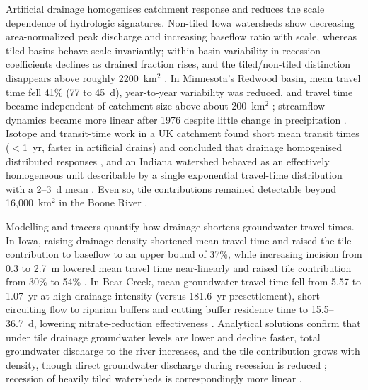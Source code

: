 Artificial drainage homogenises catchment response and reduces the scale dependence of hydrologic signatures. Non-tiled Iowa watersheds show decreasing area-normalized peak discharge and increasing baseflow ratio with scale, whereas tiled basins behave scale-invariantly; within-basin variability in recession coefficients declines as drained fraction rises, and the tiled/non-tiled distinction disappears above roughly 2200~km$^2$ \parencite{BolandBrien2014}. In Minnesota's Redwood basin, mean travel time fell 41\% (77 to 45~d), year-to-year variability was reduced, and travel time became independent of catchment size above about 200~km$^2$ \parencite{DaneshYazdi2016}; streamflow dynamics became more linear after 1976 despite little change in precipitation \parencite{FoufoulaGeorgiou2015}. Isotope and transit-time work in a UK catchment found short mean transit times ($<$1~yr, faster in artificial drains) and concluded that drainage homogenised distributed responses \parencite{DimitrovaPetrova2020}, and an Indiana watershed behaved as an effectively homogeneous unit describable by a single exponential travel-time distribution with a 2--3~d mean \parencite{Basu2010}. Even so, tile contributions remained detectable beyond 16{,}000~km$^2$ in the Boone River \parencite{Schilling2019}.

Modelling and tracers quantify how drainage shortens groundwater travel times. In Iowa, raising drainage density shortened mean travel time and raised the tile contribution to baseflow to an upper bound of 37\%, while increasing incision from 0.3 to 2.7~m lowered mean travel time near-linearly and raised tile contribution from 30\% to 54\% \parencite{Schilling2012}. In Bear Creek, mean groundwater travel time fell from 5.57 to 1.07~yr at high drainage intensity (versus 181.6~yr presettlement), short-circuiting flow to riparian buffers and cutting buffer residence time to 15.5--36.7~d, lowering nitrate-reduction effectiveness \parencite{Schilling2015}. Analytical solutions confirm that under tile drainage groundwater levels are lower and decline faster, total groundwater discharge to the river increases, and the tile contribution grows with density, though direct groundwater discharge during recession is reduced \parencite{Liang2015}; recession of heavily tiled watersheds is correspondingly more linear \parencite{Schilling2008}.

